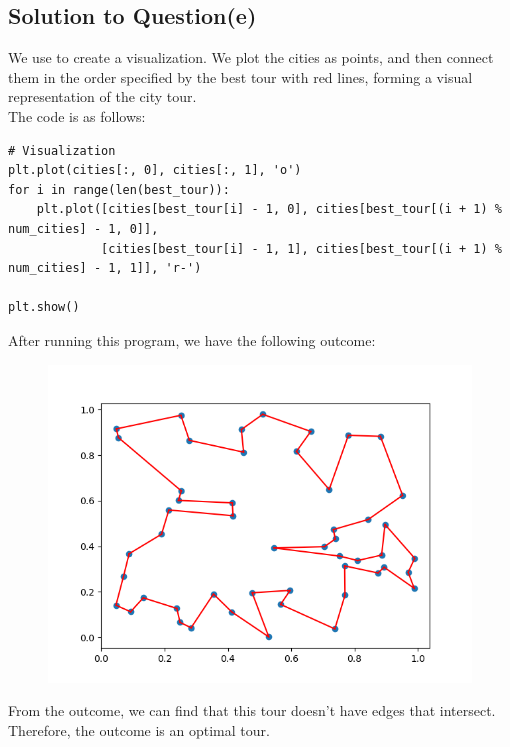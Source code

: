 \documentclass[a4paper]{article}
\begin{document}
\subsection{Solution to Question(e)}
We use  to create a visualization. We plot the cities as points, and then connect them in the order specified by the best tour with red lines, forming a visual representation of the city tour.\\
The code is as follows:
\begin{verbatim}
# Visualization
plt.plot(cities[:, 0], cities[:, 1], 'o')
for i in range(len(best_tour)):
    plt.plot([cities[best_tour[i] - 1, 0], cities[best_tour[(i + 1) % num_cities] - 1, 0]],
             [cities[best_tour[i] - 1, 1], cities[best_tour[(i + 1) % num_cities] - 1, 1]], 'r-')

plt.show()
\end{verbatim}
After running this program, we have the following outcome:
\begin{figure}[H]
    \centering
    \includegraphics[width=0.5\linewidth]{Figure_1.png}
\end{figure}
From the outcome, we can find that this tour doesn't have edges that intersect. Therefore, the outcome is an optimal tour.
\end{document}
